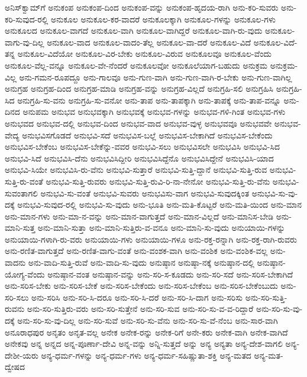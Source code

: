 {ಅನಿಸ್‌ಕ್ವಾಮ್‌ಗೆ
ಅನುಕಂಪ
ಅನುಕಂಪ-ದಿಂದ
ಅನುಕಂಪ-ವನ್ನು
ಅನುಕಂಪ-ಹೃದಯ-ರಾಗಿ
ಅನು-ಕರಿ-ಸುವರು
ಅನು-ಕರಿ-ಸುವುದ-ರಲ್ಲಿ
ಅನುಕೂಲ
ಅನುಕೂಲ-ಕರ-ವಾದರೆ
ಅನುಕೂಲಕ್ಕಾಗಿ
ಅನುಕೂಲ-ಗಳನ್ನು
ಅನುಕೂಲ-ಗಳು
ಅನುಕೂಲದ
ಅನುಕೂಲ-ವಾಗದೆ
ಅನುಕೂಲ-ವಾಗಿ
ಅನುಕೂಲ-ವಾಗಿದ್ದರೆ
ಅನುಕೂಲ-ವಾಗಿ-ರು-ವುದು
ಅನುಕೂಲ-ವಾಗು-ವು-ದಿಲ್ಲ
ಅನುಕೂಲ-ವಾದ
ಅನುಕೂಲ-ವಾದಂ-ತೆಲ್ಲ
ಅನುಕೂಲ-ವಾ-ದರೆ
ಅನುಕೂಲ-ವಿದೆ
ಅನುಕೂಲ-ವಿದೆ-ತನ್ನ
ಅನುಕೂಲ-ವಿದೆಯೋ
ಅನುಕೂಲ-ವಿರ-ಬೇಕು
ಅನುಕೂಲ-ವಿರುವ
ಅನುಕೂಲವೂ
ಅನುಕೂಲ-ವೆಂದು
ಅನುಕೂಲ-ವೆಲ್ಲ-ವನ್ನೂ
ಅನುಕೂಲ-ವೇ-ನೆಂದರೆ
ಅನುಕೂಲವೋ
ಅನುಕೂಲೆಯಾಗ-ಬಹುದು
ಅನುಕ್ರಮ
ಅನುಕ್ರಮ-ವಿಲ್ಲ
ಅನು-ಗಮನ-ರೂಪದ್ದೂ
ಅನು-ಗಾಲವೂ
ಅನು-ಗುಣ-ವಾಗಿ
ಅನು-ಗುಣ-ವಾಗಿ-ರ-ಬೇಕು
ಅನು-ಗುಣ-ವಾಗಿಲ್ಲ
ಅನುಗ್ರಹ
ಅನುಗ್ರಹ-ದಿಂದ
ಅನುಗ್ರಹ-ಮಾಡಿ
ಅನುಗ್ರಹ-ವನ್ನು
ಅನುಗ್ರಹ-ವಿಲ್ಲದೆ
ಅನುಗ್ರಹಿ-ಸಲಿ
ಅನುಗ್ರಹಿಸಿ
ಅನುಗ್ರಹಿ-ಸಿದ
ಅನುಗ್ರಹಿ-ಸು-ವನು
ಅನುಗ್ರಹಿ-ಸು-ವನೋ
ಅನು-ತಾಪ
ಅನು-ತಾಪಕ್ಕಾಗಿ
ಅನು-ತಾಪಕ್ಕೆ
ಅನು-ತಾಪ-ವನ್ನೂ
ಅನು-ದಿನದ
ಅನುಪಮ
ಅನುಭವ
ಅನುಭವಕ್ಕಾಗಿ
ಅನುಭವಕ್ಕೆ
ಅನುಭವ-ಗಳನ್ನು
ಅನುಭವ-ಗಳಿ-ಗಿಂತ
ಅನುಭವ-ಗಳು
ಅನುಭವದ
ಅನುಭವ-ದಲ್ಲಿ
ಅನುಭವ-ದಿಂದ
ಅನುಭವ-ವಾದ
ಅನುಭವ-ವುಳ್ಳ
ಅನುಭವವೂ
ಅನುಭವವೇ
ಅನುಭವ-ವೇದ್ಯ
ಅನುಭವಿಸಗೊಡದೆ
ಅನುಭವಿ-ಸದೆ
ಅನುಭವಿಸ-ಬಲ್ಲೆ
ಅನುಭವಿಸ-ಬೇಕಾಗಿದೆ
ಅನುಭವಿಸ-ಬೇಕೆಂದು
ಅನುಭವಿಸ-ಬೇಕೆಂಬ
ಅನುಭವಿಸ-ಬೇಕೆನ್ನು-ವವರ
ಅನುಭವಿ-ಸಲು
ಅನುಭವಿಸಲೇ
ಅನುಭವಿಸಿ
ಅನುಭವಿ-ಸಿದ
ಅನುಭವಿ-ಸಿದೆ
ಅನುಭವಿಸಿ-ದೆನು
ಅನುಭವಿಸಿದ್ದೀರಿ
ಅನುಭವಿಸಿದ್ದೆನೊ
ಅನುಭವಿಸಿದ್ದೇನೆ
ಅನುಭವಿಸಿ-ಯಾದ
ಅನುಭವಿ-ಸಿಯೇ
ಅನುಭವಿಸಿ-ರು-ವೆನು
ಅನುಭವಿ-ಸುತ್ತಾರೆ
ಅನುಭವಿ-ಸುತ್ತಿ-ದ್ದಾನೆ
ಅನುಭವಿ-ಸುತ್ತಿ-ರುವ
ಅನುಭವಿ-ಸುತ್ತಿ-ರು-ವಂತೆ
ಅನುಭವಿ-ಸುತ್ತಿ-ರುವರು
ಅನುಭವಿ-ಸುತ್ತಿ-ರುವಿ-ರಿ-ನಾ-ನೇನೋ
ಅನುಭವಿ-ಸುತ್ತಿ-ರು-ವೆನು
ಅನುಭವಿ-ಸುವಂತಾಗಲಿ
ಅನುಭವಿ-ಸು-ವಂತೆ
ಅನುಭವಿ-ಸುವರು
ಅನುಭವಿಸು-ವಾಗ
ಅನುಭವಿ-ಸುವುದಕ್ಕಿಂತ
ಅನುಭವಿ-ಸು-ವು-ದಕ್ಕೆ
ಅನುಭವಿ-ಸುವುದ-ರಲ್ಲಿ
ಅನುಭವಿ-ಸು-ವುದು
ಅನು-ಭೂತಿ
ಅನು-ಮತಿ-ಕೊಟ್ಟರೆ
ಅನು-ಮತಿ-ಯಿಂದ
ಅನು-ಮಾನ
ಅನು-ಮಾನ-ಗಳು
ಅನು-ಮಾ-ನ-ವನ್ನು
ಅನು-ಮಾನ-ವಾಗುತ್ತದೆ
ಅನು-ಮಾನ-ವಿಲ್ಲದೆ
ಅನು-ಮಾನಿಸ-ಬೇಡಿ
ಅನು-ಮಾನಿ-ಸುತ್ತ
ಅನು-ಮಾನಿ-ಸುತ್ತಾ
ಅನು-ಮಾನಿ-ಸುತ್ತಿರು-ವ-ವನೂ
ಅನು-ಮಾನಿ-ಸು-ವುದು
ಅನುಯಾಯಿ-ಗಳನ್ನು
ಅನುಯಾಯಿ-ಗಳಾಗಿ-ರು-ವರು
ಅನುಯಾಯಿ-ಗಳು
ಅನುಯಾಯಿ-ಗಳೂ
ಅನು-ರಕ್ತ-ರನ್ನಾಗಿ
ಅನು-ರಕ್ತ-ರಾಗಿ-ರುವರು
ಅನು-ರಣಿತ-ವಾಗುತ್ತದೆ
ಅನು-ರಣಿತ-ವಾಗು-ವಂತೆ
ಅನು-ವಂಶಕ-ವಾಗಿ
ಅನು-ವಂಶಿಕ
ಅನು-ವಂಶಿಕ-ವಲ್ಲ
ಅನು-ವಾದನು
ಅನು-ವಾದಿ-ಸುತ್ತಿ-ರುವೆ
ಅನು-ವಾದಿ-ಸು-ವುದು
ಅನುಷ್ಠಾನ
ಅನುಷ್ಠಾ-ನಕ್ಕೆ
ಅನುಷ್ಠಾನ-ದಲ್ಲಿ
ಅನುಷ್ಠಾನ-ಯೋಗ್ಯ-ವೆಂದು
ಅನುಷ್ಠಾನ-ವಂತ
ಅನುಷ್ಠಾನ-ವನ್ನು
ಅನು-ಸರಿ-ಸ-ಕೂಡದು
ಅನು-ಸರಿ-ಸದೆ
ಅನು-ಸರಿಸ-ಬೇಕಾಗಿದೆ
ಅನು-ಸರಿಸ-ಬೇಕು
ಅನು-ಸರಿಸ-ಬೇಕೆ
ಅನು-ಸರಿಸ-ಬೇಕೆಂದು
ಅನು-ಸರಿಸ-ಬೇಕೆಂಬ
ಅನು-ಸರಿಸ-ಬೇಕೆಂಬುದು
ಅನು-ಸರಿ-ಸಲು
ಅನು-ಸರಿಸಿ
ಅನು-ಸರಿ-ಸಿ-ದರೂ
ಅನು-ಸರಿ-ಸಿ-ದರೆ
ಅನು-ಸರಿ-ಸಿ-ದಾಗ
ಅನು-ಸರಿಸು
ಅನು-ಸರಿ-ಸುತ್ತಿ-ರುವನು
ಅನು-ಸರಿ-ಸುತ್ತಿರು-ವರು
ಅನು-ಸರಿ-ಸುತ್ತೇನೆ
ಅನು-ಸರಿ-ಸುವ
ಅನು-ಸರಿ-ಸು-ವ-ವ-ರಿದ್ದಾರೆ
ಅನು-ಸರಿ-ಸು-ವು-ದಕ್ಕೆ
ಅನು-ಸರಿ-ಸು-ವು-ದಿಲ್ಲ
ಅನು-ಸರಿ-ಸುವೆ
ಅನು-ಸರಿ-ಸು-ವೆನು
ಅನು-ಸರಿ-ಸು-ವೆ-ನೆಂಬ
ಅನು-ಸಾರ-ವಾಗಿ
ಅನೂರಾಧಪುರ
ಅನೃತಂ
ಅನೃತ-ವಲ್ಲ
ಅನೇಕ
ಅನೇಕ-ರನ್ನು
ಅನೇಕ-ರಿಗೆ
ಅನೇ-ಕರು
ಅನೇಕ-ವಾಗಿ
ಅನೇಕ-ವಾಗಿದೆ
ಅನೇಕವು
ಅನ್ನ
ಅನ್ನದ
ಅನ್ನ-ಪೂರ್ಣಾ-ದೇವಿ
ಅನ್ನ-ವನ್ನು
ಅನ್ನಿ-ಸುತ್ತದೆ
ಅನ್ನು
ಅನ್ಯ
ಅನ್ಯತಾ
ಅನ್ಯ-ದೇಶ-ವಾಗಲಿ
ಅನ್ಯ-ದೇಶೀ-ಯರು
ಅನ್ಯ-ಧರ್ಮ-ಗಳನ್ನು
ಅನ್ಯ-ಧರ್ಮ-ಗಳು
ಅನ್ಯ-ಧರ್ಮ-ಸಹಿಷ್ಣುತಾ-ಶಕ್ತಿ
ಅನ್ಯ-ಮತದ
ಅನ್ಯ-ಮತ-ದ್ವೇಷದ
}
